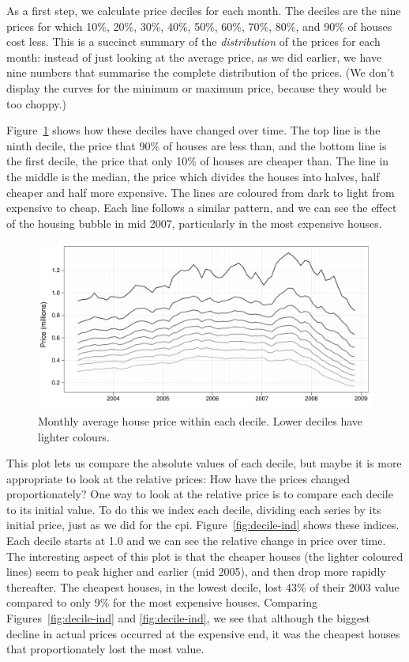 \documentclass[oneside]{article}
\begin{document}
As a first step, we calculate price deciles for each month.  The deciles are the nine prices for which 10\%, 20\%, 30\%, 40\%, 50\%, 60\%, 70\%, 80\%, and 90\% of houses cost less.  This is a succinct summary of the {\it distribution} of the prices for each month: instead of just looking at the average price, as we did earlier, we have nine numbers that summarise the complete distribution of the prices.   (We don't display the curves for the minimum or maximum price, because they would be too choppy.)

Figure~\ref{fig:decile-raw} shows how these deciles have changed over time.  The top line is the ninth decile, the price that 90\% of houses are less than, and the bottom line is the first decile, the price that only 10\% of houses are cheaper than.  The line in the middle is the median, the price which divides the houses into halves, half cheaper and half more expensive.  The lines are coloured from dark to light from expensive to cheap.  Each line follows a similar pattern, and we can see the effect of the housing bubble in mid 2007, particularly in the most expensive houses.  

\begin{figure}[htbp]
  \centering
  \includegraphics[width=0.75\linewidth]{decile-raw}
  \caption{Monthly average house price within each decile.  Lower deciles have lighter colours.} 
  \label{fig:decile-raw}
\end{figure}

This plot lets us compare the absolute values of each decile, but maybe it is more appropriate to look at the relative prices: How have the prices changed proportionately?  One way to look at the relative price is to compare each decile to its initial value.  To do this we index each decile, dividing each series by its initial price, just as we did for the {\sc cpi}. Figure~\ref{fig:decile-ind} shows these indices.  Each decile starts at 1.0 and we can see the relative change in price over time.  The interesting aspect of this plot is that the cheaper houses (the lighter coloured lines) seem to peak higher and earlier (mid 2005), and then drop more rapidly thereafter.  The cheapest houses, in the lowest decile, lost 43\% of their 2003 value compared to only 9\% for the most expensive houses. Comparing Figures~\ref{fig:decile-ind} and \ref{fig:decile-ind}, we see that although the biggest decline in actual prices occurred at the expensive end, it was the cheapest houses that proportionately lost the most value. 
\end{document}
